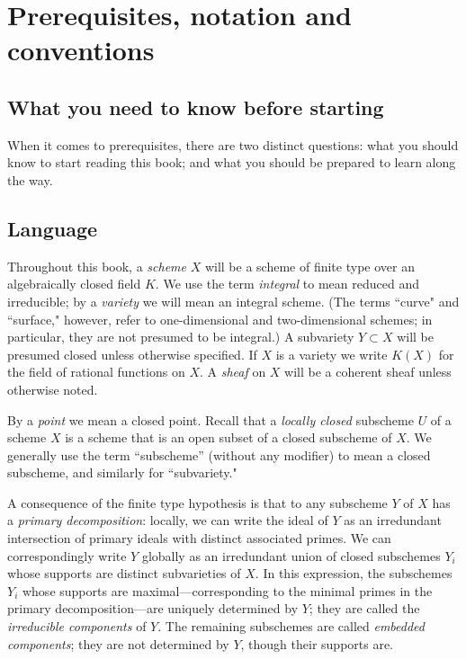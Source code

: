\section{Prerequisites, notation and conventions}

\subsection{What you need to know before starting}
When it comes to prerequisites, there are two distinct questions: what you should know to start reading this book; and what you should be prepared to learn along the way. 


\subsection{Language}
 

Throughout this book, a \emph{scheme} $X$ will be a scheme of finite type over an algebraically closed field
$K$. We use the term \emph{integral} to mean reduced and irreducible; by a \emph{variety} we will mean an integral scheme. (The terms ``curve" and ``surface," however, refer to one-dimensional and two-dimensional schemes; in particular, they are not presumed to be integral.) A subvariety $Y \subset X$ will be presumed closed unless otherwise specified.
 If $X$ is a variety we write $K(X)$ for the field of rational functions on $X$. A \emph{sheaf} on $X$ will be a coherent sheaf unless otherwise noted.
 
By a \emph{point}
we mean a closed point. 
Recall that a \emph{locally closed} subscheme $U$ of a scheme $X$ is 
a scheme that is an open subset of a closed subscheme of $X$. We generally use the term
``subscheme'' (without any modifier) to mean a closed subscheme, and similarly for ``subvariety."

A consequence of the finite type hypothesis
is that to any subscheme $Y$ of 
$X$ has a \emph{primary decomposition}: locally, we can write the ideal of $Y$ as an irredundant intersection of primary ideals with distinct associated primes. We can correspondingly write $Y$ globally as an irredundant union of closed subschemes $Y_i$ whose supports are distinct subvarieties of $X$. In this expression, the subschemes $Y_i$ whose supports are maximal---corresponding to the minimal primes in the primary decomposition---are uniquely determined by $Y$; they are called the \emph{irreducible components} of $Y$. The remaining subschemes are called \emph{embedded components}; they are not determined by $Y$, though their supports are.


